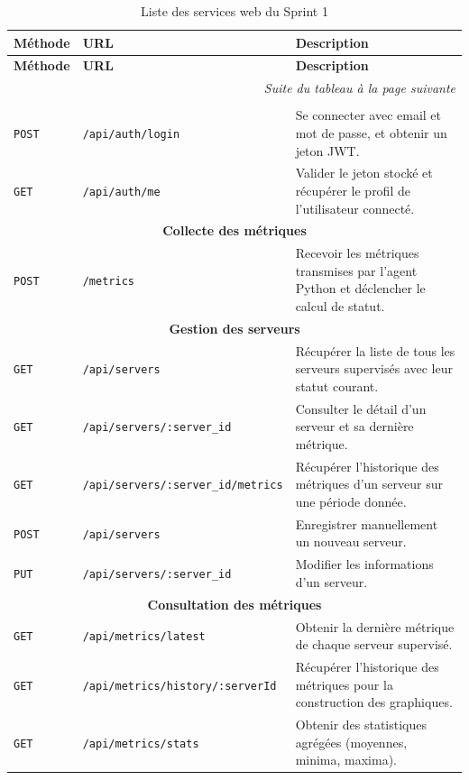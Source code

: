 \renewcommand{\arraystretch}{1.3}
\small
\begin{longtable}{|p{1.6cm}|p{7.0cm}|p{5.8cm}|}
\hline
\textbf{Méthode} & \textbf{URL} & \textbf{Description} \\
\hline
\endfirsthead

\hline
\textbf{Méthode} & \textbf{URL} & \textbf{Description} \\
\hline
\endhead

\hline
\multicolumn{3}{r}{\textit{Suite du tableau à la page suivante}} \\
\endfoot

\hline
\caption{Liste des services web du Sprint 1}
\label{tab:ws-sprint1}
\endlastfoot

\multicolumn{3}{|c|}{\textbf{Authentification}} \\
\hline
\texttt{POST} & \texttt{/api/auth/login} & Se connecter avec email et mot de passe, et obtenir un jeton JWT. \\
\hline
\texttt{GET} & \texttt{/api/auth/me} & Valider le jeton stocké et récupérer le profil de l'utilisateur connecté. \\
\hline

\multicolumn{3}{|c|}{\textbf{Collecte des métriques}} \\
\hline
\texttt{POST} & \texttt{/metrics} & Recevoir les métriques transmises par l'agent Python et déclencher le calcul de statut. \\
\hline

\multicolumn{3}{|c|}{\textbf{Gestion des serveurs}} \\
\hline
\texttt{GET} & \texttt{/api/servers} & Récupérer la liste de tous les serveurs supervisés avec leur statut courant. \\
\hline
\texttt{GET} & \texttt{/api/servers/:server\_id} & Consulter le détail d'un serveur et sa dernière métrique. \\
\hline
\texttt{GET} & \texttt{/api/servers/:server\_id/metrics} & Récupérer l'historique des métriques d'un serveur sur une période donnée. \\
\hline
\texttt{POST} & \texttt{/api/servers} & Enregistrer manuellement un nouveau serveur. \\
\hline
\texttt{PUT} & \texttt{/api/servers/:server\_id} & Modifier les informations d'un serveur. \\
\hline

\multicolumn{3}{|c|}{\textbf{Consultation des métriques}} \\
\hline
\texttt{GET} & \texttt{/api/metrics/latest} & Obtenir la dernière métrique de chaque serveur supervisé. \\
\hline
\texttt{GET} & \texttt{/api/metrics/history/:serverId} & Récupérer l'historique des métriques pour la construction des graphiques. \\
\hline
\texttt{GET} & \texttt{/api/metrics/stats} & Obtenir des statistiques agrégées (moyennes, minima, maxima). \\
\hline


\end{longtable}
